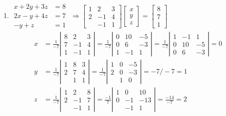\documentclass[twoside]{amsart}
\theoremstyle{plain}
\theoremstyle{definition}
\newcommand{\exercisehead}[1]
  {
   \noindent{\small\bf Exercise #1.}
   \smallskip}
\begin{document}
\exercisehead{5}\begin{enumerate}
\item $\begin{aligned}
  x + 2y + 3z & = 8 \\
  2x -y + 4z & = 7 \\
  -y + z & = 1 
\end{aligned}$ $\Longrightarrow \left[ \begin{matrix} 1 & 2 & 3 \\ 2 & -1 & 4 \\ & -1 & 1 \end{matrix} \right]\left[ \begin{matrix} x \\ y \\ z \end{matrix} \right] = \left[ \begin{matrix} 8 \\ 7 \\ 1 \end{matrix} \right]$ 
\[
\begin{aligned}
x & =\frac{1}{-7} \left| \begin{matrix} 8 & 2 & 3 \\ 7 & -1 & 4 \\ 1 & -1 & 1 \end{matrix} \right| = \frac{1}{-7} \left| \begin{matrix} 0 & 10 & -5 \\ 0 & 6 & -3  \\ 1 & -1 & 1 \end{matrix} \right| = \frac{1}{-7} \left| \begin{matrix} 1 & -1 & 1 \\ 0 & 10 & -5 \\ 0 & 6 & -3 \end{matrix} \right| = 0 \\
y & = \frac{1}{-7} \left| \begin{matrix} 1 & 8 & 3 \\ 2 & 7 & 4 \\ & 1 & 1 \end{matrix} \right| = \frac{1}{-7} \left| \begin{matrix} 1 & 0 & -5 \\ 2 & 0 & -3 \\ & 1 & 0 \end{matrix} \right| = -7 /-7 = 1 \\
z & = \frac{1}{-7} \left| \begin{matrix} 1 & 2 & 8 \\ 2 & -1 & 7 \\ & -1 & 1 \end{matrix} \right| = \frac{-1}{7} \left| \begin{matrix} 1 & 0 & 10 \\ 0 & -1 & -13 \\ & - 1 & 1 \end{matrix} \right| = \frac{-14}{-7} = 2 

\end{aligned}\]
\end{enumerate}
\end{document}
